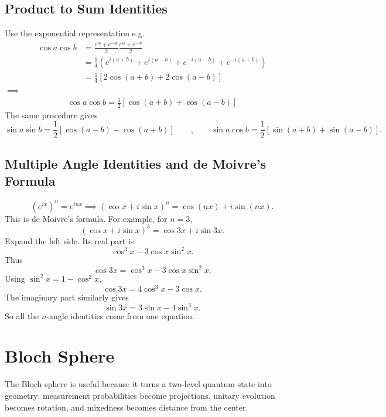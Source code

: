 \documentclass[11pt, answers]{exam}
\begin{document}
    \subsection{Product to Sum Identities}
    Use the exponential representation e.g.
    \begin{align*}
        \cos a\cos b &= \frac{e^{ia}+e^{-ia}}{2}\frac{e^{ib}+e^{-ib}}{2} \\
        &=\frac14
        \left(
        e^{i(a+b)}
        +e^{i(a-b)}
        +e^{-i(a-b)}
        +e^{-i(a+b)}
        \right) \\
        &=\frac14
        \left[
        2\cos(a+b)+2\cos(a-b)
        \right]
    \end{align*}
    $\implies$
    \begin{align*}
        \boxed{
        \cos a\cos b
        =
        \frac12[\cos(a+b)+\cos(a-b)]
        }
    \end{align*}
    The same procedure gives
    \[
    \boxed{
    \sin a\sin b
    =
    \frac12[\cos(a-b)-\cos(a+b)]
    }\qquad,\qquad
    \boxed{
    \sin a\cos b
    =
    \frac12[\sin(a+b)+\sin(a-b)]
    }.
    \]

    \subsection{Multiple Angle Identities and de Moivre's Formula}
    \[
    (e^{ix})^n=e^{inx} \implies
    \boxed{
    (\cos x+i\sin x)^n
    =
    \cos(nx)+i\sin(nx)
    }.
    \]This is de Moivre's formula.
    For example, for \(n=3\),
    \[
    (\cos x+i\sin x)^3
    =
    \cos3x+i\sin3x.
    \]Expand the left side. Its real part is
    \[
    \cos^3x-3\cos x\sin^2x.
    \]Thus
    \[
    \cos3x
    =
    \cos^3x-3\cos x\sin^2x.
    \]Using \(\sin^2x=1-\cos^2x\),
    \[
    {\cos3x=4\cos^3x-3\cos x}.
    \]The imaginary part similarly gives
    \[
    {\sin3x=3\sin x-4\sin^3x}.
    \]So all the \(n\)-angle identities come from one equation.

    \section{Bloch Sphere}
    The Bloch sphere is useful because it turns a two-level quantum state into geometry: measurement probabilities become projections, unitary evolution becomes rotation, and mixedness becomes distance from the center.
\end{document}
